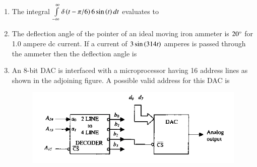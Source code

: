 \documentclass[journal,12pt,onecolumn]{IEEEtran}
\theoremstyle{remark}
\begin{document}
\begin{enumerate}
\hfill{}\begin{enumerate}  \end{enumerate}



\item The integral $\int\limits_{-\infty}^{\infty} \delta\left(t - \pi/6\right) 6 \sin\left(t\right) dt$ evaluates to

\hfill{}\begin{enumerate}  \end{enumerate}



\item The deflection angle of the pointer of an ideal moving iron ammeter is $20\degree$ for 1.0 ampere dc current. If a current of $3 \sin\left(314t\right)$ amperes is passed through the ammeter then the deflection angle is

\hfill{}\begin{enumerate}  \end{enumerate}



\item An 8-bit DAC is interfaced with a microprocessor having 16 address lines  as shown in the adjoining figure. A possible valid address for this DAC is
\begin{figure}[H]
    \centering
    \includegraphics[width = 0.7\columnwidth]{q23}
    \caption*{}
    \label{fig:Q23}
\end{figure}


\end{enumerate}
\end{document}
